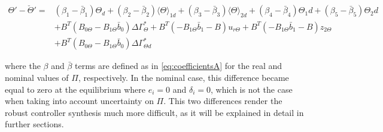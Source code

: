 \documentclass[../main.tex]{subfiles}
\begin{document}
\begin{align}
	\Theta' - \check{\Theta}' =& (\beta_1 - \bar{\beta}_1) \Theta_d + (\beta_2 - \bar{\beta}_2) \langle \Theta \rangle_{1d} +(\beta_3 - \bar{\beta}_3) \langle \Theta \rangle_{2d} + (\beta_4 - \bar{\beta}_4) \Theta_1d + (\beta_5 - \bar{\beta}_5) \Theta_2d \nonumber \\
	&+ B^T(B_{0\Theta} - B_{1\Theta}\bar{b}_0) \Delta \Gamma_\Theta^* + B^T(-B_{1\Theta}\bar{b}_1 - B)u_{r\Theta} + B^T(-B_{1\Theta}\bar{b}_1 - B)z_{2\Theta} \nonumber \\
	&+ B^T(B_{0\Theta} - B_{1\Theta}\bar{b}_0) \Delta \Gamma_{\Theta d}^*
\end{align}

where the $\beta$ and $\bar{\beta}$ terms are defined as in \eqref{eq:coefficientsA} for the real and nominal values of $\Pi$, respectively. In the nominal case, this difference became equal to zero at the equilibrium where $e_i = 0$ and $\delta_i = 0$, which is not the case when taking into account uncertainty on $\Pi$. This two differences render the robust controller synthesis much more difficult, as it will be explained in detail in further sections.
\end{document}
